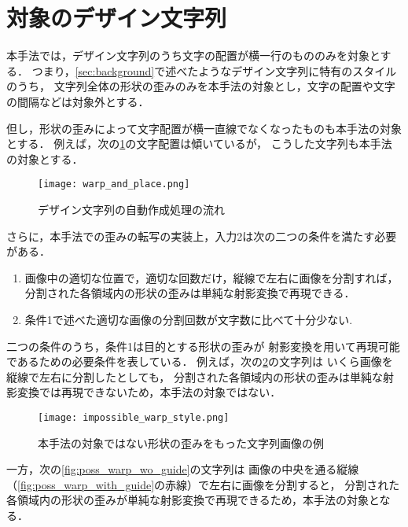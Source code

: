 \documentclass[\homedir/main.tex]{subfiles}
\begin{document}
\section{対象のデザイン文字列}\label{sec:target_design_text}
本手法では，デザイン文字列のうち文字の配置が横一行のもののみを対象とする．
つまり，\cref{sec:background}で述べたようなデザイン文字列に特有のスタイルのうち，
文字列全体の形状の歪みのみを本手法の対象とし，文字の配置や文字の間隔などは対象外とする．

但し，形状の歪みによって文字配置が横一直線でなくなったものも本手法の対象とする．
例えば，次の\cref{fig:warp_and_place}の文字配置は傾いているが，
こうした文字列も本手法の対象とする．

\begin{figure}[h]
    \centering
    \texttt{[image: warp\_and\_place.png]}
    \caption{デザイン文字列の自動作成処理の流れ}
    \label{fig:warp_and_place}
\end{figure}

\newpage
さらに，本手法での歪みの転写の実装上，入力2は次の二つの条件を満たす必要がある．

\begin{enumerate}[label=\textbf{条件\arabic*:}]
    \item 画像中の適切な位置で，適切な回数だけ，縦線で左右に画像を分割すれば，
          分割された各領域内の形状の歪みは単純な射影変換で再現できる．
    \item 条件1で述べた適切な画像の分割回数が文字数に比べて十分少ない.
\end{enumerate}

二つの条件のうち，条件1は目的とする形状の歪みが
射影変換を用いて再現可能であるための必要条件を表している．
例えば，次の\cref{fig:impossible_warp_style}の文字列は
いくら画像を縦線で左右に分割したとしても，
分割された各領域内の形状の歪みは単純な射影変換では再現できないため，本手法の対象ではない．

\begin{figure}[h]
    \centering
    \texttt{[image: impossible\_warp\_style.png]}
    \caption{本手法の対象ではない形状の歪みをもった文字列画像の例}
    \label{fig:impossible_warp_style}
\end{figure}

一方，次の\cref{fig:poss_warp_wo_guide}の文字列は
画像の中央を通る縦線（\cref{fig:poss_warp_with_guide}の赤線）で左右に画像を分割すると，
分割された各領域内の形状の歪みが単純な射影変換で再現できるため，本手法の対象となる．
\end{document}
